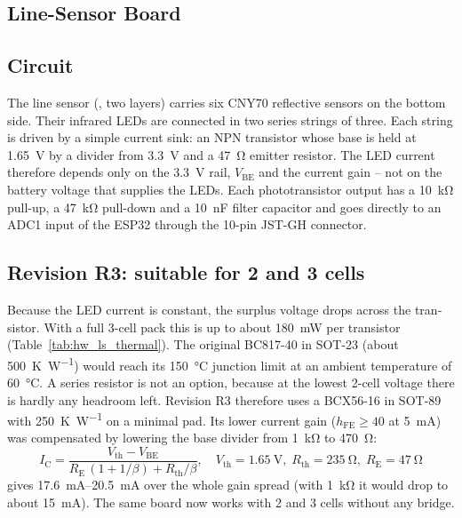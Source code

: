 \begin{otherlanguage}{english}
\section{Line-Sensor Board}
\label{sec:hw_linesensor}

\subsection{Circuit}
The line sensor (, two layers) carries six CNY70 reflective sensors
\cite{Vishay_CNY70x} on the bottom side. Their infrared LEDs are connected in two series strings of three.
Each string is driven by a simple current sink: an NPN transistor whose base is held at \SI{1.65}{\volt} by a
divider from \SI{3.3}{\volt} and a \SI{47}{\ohm} emitter resistor. The LED current therefore depends only on
the \SI{3.3}{\volt} rail, $V_\text{BE}$ and the current gain -- not on the battery voltage that supplies the
LEDs. Each phototransistor output has a \SI{10}{\kilo\ohm} pull-up, a \SI{47}{\kilo\ohm} pull-down and a
\SI{10}{\nano\farad} filter capacitor and goes directly to an ADC1 input of the ESP32 through the 10-pin JST-GH
connector.

\subsection{Revision R3: suitable for 2 and 3 cells}
Because the LED current is constant, the surplus voltage drops across the transistor. With a full 3-cell pack
this is up to about \SI{180}{\milli\watt} per transistor (Table~\ref{tab:hw_ls_thermal}). The original
BC817-40 in SOT-23 (about \SI{500}{\kelvin\per\watt}) would reach its \SI{150}{\celsius} junction limit at an
ambient temperature of \SI{60}{\celsius}. A series resistor is not an option, because at the lowest 2-cell voltage
there is hardly any headroom left. Revision R3 therefore uses a BCX56-16 in SOT-89 \cite{Diodes_BCX5616Q,MCC_BCX56}
with \SI{250}{\kelvin\per\watt} on a minimal pad. Its lower current gain ($h_\text{FE}\ge 40$ at \SI{5}{\milli\ampere})
was compensated by lowering the base divider from \SI{1}{\kilo\ohm} to \SI{470}{\ohm}:
\begin{equation}
  I_\text{C} = \frac{V_\text{th}-V_\text{BE}}{R_\text{E}\,(1+1/\beta)+R_\text{th}/\beta},\quad
  V_\text{th}=\SI{1.65}{\volt},\; R_\text{th}=\SI{235}{\ohm},\; R_\text{E}=\SI{47}{\ohm}
\end{equation}
gives \SIrange{17.6}{20.5}{\milli\ampere} over the whole gain spread (with \SI{1}{\kilo\ohm} it would drop to
about \SI{15}{\milli\ampere}). The same board now works with 2 and 3 cells without any bridge.


\end{otherlanguage}
